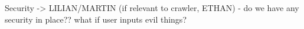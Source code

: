 Security -> LILIAN/MARTIN (if relevant to crawler, ETHAN)
  - do we have any security in place?? what if user inputs evil things?
